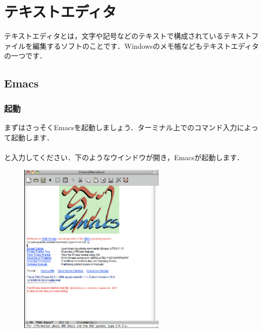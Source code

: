 \documentclass{jarticle}
\begin{document}
\newpage
\section{テキストエディタ}
テキストエディタとは，文字や記号などのテキストで構成されているテキストファイルを編集するソフトのことです．Windowsのメモ帳などもテキストエディタの一つです．
\subsection{Emacs}



\subsubsection{起動}
まずはさっそくEmacsを起動しましょう．ターミナル上でのコマンド入力によっ
て起動します．\\
\quad \quad {}\\
と入力してください．下のようなウインドウが開き，Emacsが起動します．

\begin{figure}[ht]
  \begin{center}
    \includegraphics[width=70mm,pagebox=cropbox,clip]{fig/emacs001.pdf}
  \end{center}
\end{figure} 
\end{document}
